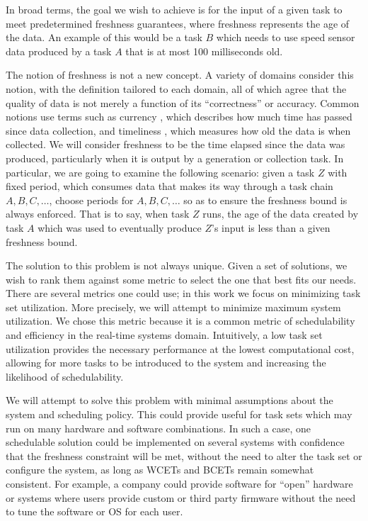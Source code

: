 In broad terms, the goal we wish to achieve is for the input of a given task to meet predetermined freshness guarantees, where freshness represents the age of the data. An example of this would be a task $B$ which needs to use speed sensor data produced by a task $A$ that is at most 100 milliseconds old.

The notion of freshness is not a new concept. A variety of domains consider this notion, with the definition tailored to each domain, all of which agree that the quality of data is not merely a function of its ``correctness'' or accuracy. Common notions use terms such as currency \cite{Segev1990}, which describes how much time has passed since data collection, and timeliness \cite{Wang:1996:BAD:1189570.1189572}, which measures how old the data is when collected. We will consider freshness to be the time elapsed since the data was produced, particularly when it is output by a generation or collection task. In particular, we are going to examine the following scenario: given a task $Z$ with fixed period, which consumes data that makes its way through a task chain $A, B, C, \ldots$, choose periods for $A, B, C, \ldots$ so as to ensure the freshness bound is always enforced. That is to say, when task $Z$ runs, the age of the data created by task $A$ which was used to eventually produce $Z$'s input is less than a given freshness bound.

The solution to this problem is not always unique. Given a set of solutions, we wish to rank them against some metric to select the one that best fits our needs. There are several metrics one could use; in this work we focus on minimizing task set utilization. More precisely, we will attempt to minimize maximum system utilization. We chose this metric because it is a common metric of schedulability and efficiency in the real-time systems domain. Intuitively, a low task set utilization provides the necessary performance at the lowest computational cost, allowing for more tasks to be introduced to the system and increasing the likelihood of schedulability.

We will attempt to solve this problem with minimal assumptions about the system and scheduling policy. This could provide useful for task sets which may run on many hardware and software combinations. In such a case, one schedulable solution could be implemented on several systems with confidence that the freshness constraint will be met, without the need to alter the task set or configure the system, as long as WCETs and BCETs remain somewhat consistent. For example, a company could provide software for ``open'' hardware or systems where users provide custom or third party firmware without the need to tune the software or OS for each user.